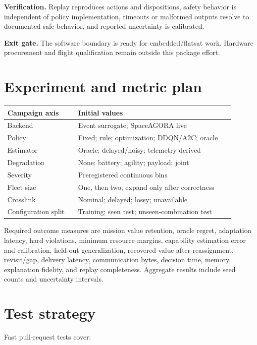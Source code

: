 \documentclass[11pt]{article}
\begin{document}
\textbf{Verification.}
Replay reproduces actions and dispositions, safety behavior is independent of
policy implementation, timeouts or malformed outputs resolve to documented
safe behavior, and reported uncertainty is calibrated.

\textbf{Exit gate.}
The software boundary is ready for embedded/flatsat work.  Hardware
procurement and flight qualification remain outside this package effort.

\section{Experiment and metric plan}

\begin{longtable}{P{0.29\linewidth}P{0.62\linewidth}}
\toprule
Campaign axis & Initial values \\
\midrule
\endhead
Backend & Event surrogate; SpaceAGORA live \\
Policy & Fixed; rule; optimization; DDQN/A2C; oracle \\
Estimator & Oracle; delayed/noisy; telemetry-derived \\
Degradation & None; battery; agility; payload; joint \\
Severity & Preregistered continuous bins \\
Fleet size & One, then two; expand only after correctness \\
Crosslink & Nominal; delayed; lossy; unavailable \\
Configuration split & Training; seen test; unseen-combination test \\
\bottomrule
\end{longtable}

Required outcome measures are mission value retention, oracle regret,
adaptation latency, hard violations, minimum resource margins, capability
estimation error and calibration, held-out generalization, recovered value
after reassignment, revisit/gap, delivery latency, communication bytes,
decision time, memory, explanation fidelity, and replay completeness.
Aggregate results include seed counts and uncertainty intervals.

\section{Test strategy}

Fast pull-request tests cover:
\end{document}
